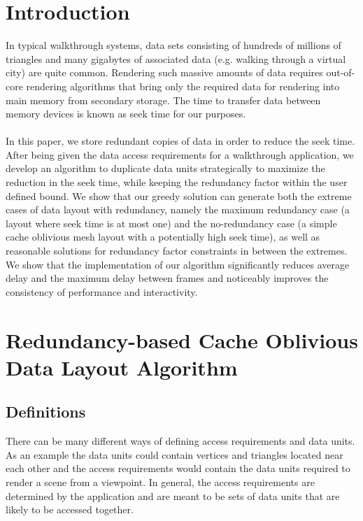 
\section{Introduction}

In typical walkthrough systems, data sets consisting of hundreds of millions of
triangles and many gigabytes of associated data (e.g. walking through a virtual
city) are quite common. Rendering such massive amounts of data requires
out-of-core rendering algorithms that bring only the required data for
rendering into main memory from secondary storage. The time to transfer data between memory
devices
is known as seek time for our purposes. \\
\\
In this paper, we store redundant
copies of data in order to reduce the seek time. After being given
the data access requirements for a walkthrough application, we develop
an algorithm to duplicate data units strategically to maximize the reduction
in the seek time, while keeping the redundancy factor within the user defined
bound. We show that our greedy solution can generate both the extreme cases
of data layout with redundancy, namely the maximum redundancy case
(a layout where seek time is at most one) and the no-redundancy case (a simple
cache oblivious mesh layout with a potentially high seek time), as well as
reasonable solutions for redundancy factor constraints in between the extremes.
We show that the
implementation of our algorithm significantly reduces average delay and the maximum delay between
frames and noticeably improves the consistency of performance and
interactivity.

\section{Redundancy-based Cache Oblivious Data Layout Algorithm}

\subsection{Definitions}

There can be many different ways of defining access requirements and data
units. As an example the data units could contain vertices and triangles located near each other and the access requirements would contain the data units required to render a scene from a viewpoint. In general,
the access requirements are determined by the application and are meant to be
sets of data units that are likely to be accessed together. 

